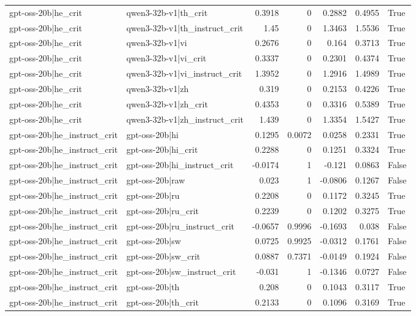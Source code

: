 \begin{table}
\begin{tabular}{l l r r r r l}
gpt-oss-20b|he_crit & qwen3-32b-v1|th_crit & 0.3918 & 0 & 0.2882 & 0.4955 & True \\
gpt-oss-20b|he_crit & qwen3-32b-v1|th_instruct_crit & 1.45 & 0 & 1.3463 & 1.5536 & True \\
gpt-oss-20b|he_crit & qwen3-32b-v1|vi & 0.2676 & 0 & 0.164 & 0.3713 & True \\
gpt-oss-20b|he_crit & qwen3-32b-v1|vi_crit & 0.3337 & 0 & 0.2301 & 0.4374 & True \\
gpt-oss-20b|he_crit & qwen3-32b-v1|vi_instruct_crit & 1.3952 & 0 & 1.2916 & 1.4989 & True \\
gpt-oss-20b|he_crit & qwen3-32b-v1|zh & 0.319 & 0 & 0.2153 & 0.4226 & True \\
gpt-oss-20b|he_crit & qwen3-32b-v1|zh_crit & 0.4353 & 0 & 0.3316 & 0.5389 & True \\
gpt-oss-20b|he_crit & qwen3-32b-v1|zh_instruct_crit & 1.439 & 0 & 1.3354 & 1.5427 & True \\
gpt-oss-20b|he_instruct_crit & gpt-oss-20b|hi & 0.1295 & 0.0072 & 0.0258 & 0.2331 & True \\
gpt-oss-20b|he_instruct_crit & gpt-oss-20b|hi_crit & 0.2288 & 0 & 0.1251 & 0.3324 & True \\
gpt-oss-20b|he_instruct_crit & gpt-oss-20b|hi_instruct_crit & -0.0174 & 1 & -0.121 & 0.0863 & False \\
gpt-oss-20b|he_instruct_crit & gpt-oss-20b|raw & 0.023 & 1 & -0.0806 & 0.1267 & False \\
gpt-oss-20b|he_instruct_crit & gpt-oss-20b|ru & 0.2208 & 0 & 0.1172 & 0.3245 & True \\
gpt-oss-20b|he_instruct_crit & gpt-oss-20b|ru_crit & 0.2239 & 0 & 0.1202 & 0.3275 & True \\
gpt-oss-20b|he_instruct_crit & gpt-oss-20b|ru_instruct_crit & -0.0657 & 0.9996 & -0.1693 & 0.038 & False \\
gpt-oss-20b|he_instruct_crit & gpt-oss-20b|sw & 0.0725 & 0.9925 & -0.0312 & 0.1761 & False \\
gpt-oss-20b|he_instruct_crit & gpt-oss-20b|sw_crit & 0.0887 & 0.7371 & -0.0149 & 0.1924 & False \\
gpt-oss-20b|he_instruct_crit & gpt-oss-20b|sw_instruct_crit & -0.031 & 1 & -0.1346 & 0.0727 & False \\
gpt-oss-20b|he_instruct_crit & gpt-oss-20b|th & 0.208 & 0 & 0.1043 & 0.3117 & True \\
gpt-oss-20b|he_instruct_crit & gpt-oss-20b|th_crit & 0.2133 & 0 & 0.1096 & 0.3169 & True \\

\end{tabular}
\end{table}

